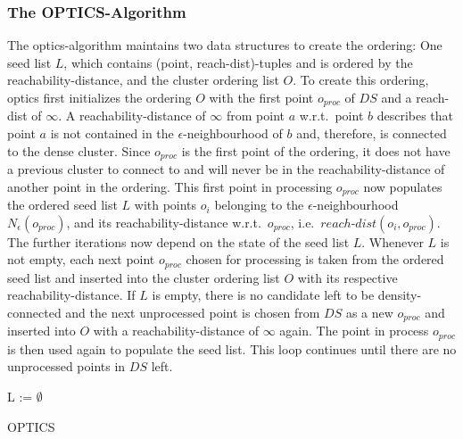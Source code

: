 \subsubsection*{The OPTICS-Algorithm} %
The \gls{optics}-algorithm maintains two data structures to create the ordering: One seed list $L$, which contains (point, reach-dist)-tuples and is ordered by the reachability-distance, and the cluster ordering list $O$. 
To create this ordering, \gls{optics} first initializes the ordering $O$ with the first point $o_{proc}$ of $DS$ and a reach-dist of $\infty$. A reachability-distance of $\infty$ from point $a$ w.r.t.\ point $b$ describes that point $a$ is not contained in the $\epsilon$-neighbourhood of $b$ and, therefore, is connected to the dense cluster. Since $o_{proc}$ is the first point of the ordering, it does not have a previous cluster to connect to and will never be in the reachability-distance of another point in the ordering. This first point in processing $o_{proc}$ now populates the ordered seed list $L$ with points $o_i$ belonging to the $\epsilon$-neighbourhood $N_\epsilon(o_{proc})$, and its reachability-distance w.r.t.\ $o_{proc}$, i.e.\ $reach$-$dist(o_i, o_{proc})$. The further iterations now depend on the state of the seed list $L$. Whenever $L$ is not empty, each next point $o_{proc}$ chosen for processing is taken from the ordered seed list and inserted into the cluster ordering list $O$ with its respective reachability-distance. If $L$ is empty, there is no candidate left to be density-connected and the next unprocessed point is chosen from $DS$ as a new $o_{proc}$ and inserted into $O$ with a reachability-distance of $\infty$ again. The point in process $o_{proc}$ is then used again to populate the seed list. This loop continues until there are no unprocessed points in $DS$ left.

\vspace{5mm}

\begin{algorithm}[H]
\SetAlgoLined
{}
 L := $\emptyset$\;
 \caption{OPTICS}
\end{algorithm}
\vspace{5mm}

